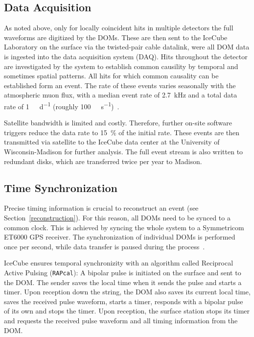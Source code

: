 \subsection{Data Acquisition}\label{data_acquisition}
As noted above, only for locally coincident hits in multiple detectors the full waveforms are digitized by the DOMs. These are then sent to the IceCube Laboratory on the surface via the twisted-pair cable datalink, were all DOM data is ingested into the data acquisition system (DAQ). Hits throughout the detector are investigated by the system to establish common causility by temporal and sometimes spatial patterns. All hits for which common causality can be established form an event. The rate of these events varies seasonally with the atmospheric muon flux, with a median event rate of \SI{2.7}{\kilo\Hz} and a total data rate of \SI{1}{\tera\byte\per\day} (roughly \SI{100}{\mega\bit\per\second})~\cite{Aartsen2017}.

Satellite bandwidth is limited and costly. Therefore, further on-site software triggers reduce the data rate to \SI{15}{\percent} of the initial rate. These events are then transmitted via satellite to the IceCube data center at the University of Wisconsin-Madison for further analysis. The full event stream is also written to redundant disks, which are transferred twice per year to Madison.

\subsection{Time Synchronization}
Precise timing information is crucial to reconstruct an event (see Section~\ref{reconstruction}). For this reason, all DOMs need to be synced to a common clock. This is achieved by syncing the whole system to a Symmetricom ET6000 GPS receiver. The synchronization of individual DOMs is performed once per second, while data transfer is paused during the process~.

IceCube ensures temporal synchronizity with an algorithm called Reciprocal Active Pulsing (\texttt{RAPcal}): A bipolar pulse is initiated on the surface and sent to the DOM. The sender saves the local time when it sends the pulse and starts a timer. Upon reception down the string, the DOM also saves its current local time, saves the received pulse waveform, starts a timer, responds with a bipolar pulse of its own and stops the timer. Upon reception, the surface station stops its timer and requests the received pulse waveform and all timing information from the DOM.

